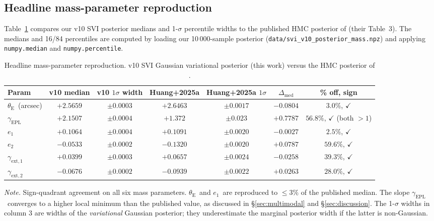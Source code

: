 \documentclass[11pt,letterpaper]{article}
\newcommand{\thetaE}{\ensuremath{\theta_{\mathrm{E}}}}
\newcommand{\gammaEPL}{\ensuremath{\gamma_{\mathrm{EPL}}}}
\newcommand{\gextone}{\ensuremath{\gamma_{\mathrm{ext},1}}}
\newcommand{\gexttwo}{\ensuremath{\gamma_{\mathrm{ext},2}}}
\newcommand{\eone}{\ensuremath{e_{1}}}
\newcommand{\etwo}{\ensuremath{e_{2}}}
\begin{document}
\subsection{Headline mass-parameter reproduction}
\label{sec:headline}

Table~\ref{tab:mass} compares our v10 SVI posterior medians and 1-$\sigma$
percentile widths to the published HMC posterior of
\citet{huang2025foundry1} (their Table~3). The medians and 16/84
percentiles are computed by loading our 10\,000-sample posterior
(\texttt{data/svi\_v10\_posterior\_mass.npz}) and applying
\texttt{numpy.median} and \texttt{numpy.percentile}.

\begin{table}[ht]
\centering
\caption{Headline mass-parameter reproduction. v10 SVI Gaussian
variational posterior (this work) versus the HMC posterior of
\citet[][Table 3]{huang2025foundry1}.}
\label{tab:mass}
\small
\begin{tabular}{lcccccc}
\toprule
Param & v10 median & v10 $1\sigma$ width &
Huang+2025a & Huang+2025a $1\sigma$ &
$\Delta_{\mathrm{med}}$ &
\% off, sign \\
\midrule
\thetaE\ (arcsec) & $+2.5659$ & $\pm0.0003$ & $+2.6463$ & $\pm0.0017$ & $-0.0804$ & $3.0\%$, $\checkmark$ \\
\gammaEPL\        & $+2.1507$ & $\pm0.0004$ & $+1.372$  & $\pm0.023$  & $+0.7787$ & $56.8\%$, $\checkmark$ (both $>1$) \\
\eone\            & $+0.1064$ & $\pm0.0004$ & $+0.1091$ & $\pm0.0020$ & $-0.0027$ & $2.5\%$, $\checkmark$ \\
\etwo\            & $-0.0533$ & $\pm0.0002$ & $-0.1320$ & $\pm0.0020$ & $+0.0787$ & $59.6\%$, $\checkmark$ \\
\gextone\         & $+0.0399$ & $\pm0.0003$ & $+0.0657$ & $\pm0.0024$ & $-0.0258$ & $39.3\%$, $\checkmark$ \\
\gexttwo\         & $-0.0676$ & $\pm0.0002$ & $-0.0939$ & $\pm0.0022$ & $+0.0263$ & $28.0\%$, $\checkmark$ \\
\bottomrule
\end{tabular}
\par\smallskip
{\footnotesize\textit{Note.} Sign-quadrant agreement on all six mass
parameters. \thetaE\ and \eone\ are reproduced to $\le3\%$ of the
published median. The slope \gammaEPL\ converges to a higher local
minimum than the published value, as discussed in
\S\ref{sec:multimodal} and \S\ref{sec:discussion}. The 1-$\sigma$ widths
in column 3 are widths of the \textit{variational} Gaussian posterior;
they underestimate the marginal posterior width if the latter is
non-Gaussian.}
\end{table}
\end{document}
